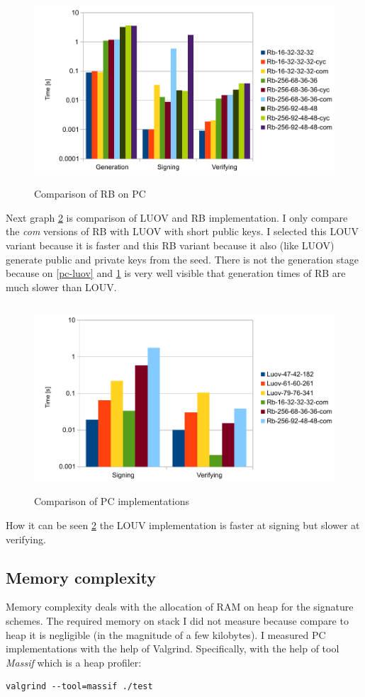 \documentclass[thesis=M,english]{FITthesis}[2019/12/23]
\begin{document}
\begin{figure}[H]
\centering
\includegraphics[width=13cm,height=7cm]{images/pc-rb.pdf}
\caption{Comparison of RB on PC}
\label{pc-rb}
\end{figure}

\noindent
Next graph \ref{pc-all} is comparison of LUOV and RB implementation. I only compare the \textit{com} versions of RB with LUOV with short public keys. I selected this LOUV variant because it is faster and this RB variant because it also (like LUOV) generate public and private keys from the seed.
There is not the generation stage because on \ref{pc-luov} and \ref{pc-rb} is very well visible that generation times of RB are much slower than LOUV. 

\begin{figure}[H]
\centering
\includegraphics[width=13cm,height=7cm]{images/pc-all.pdf}
\caption{Comparison of PC implementations}
\label{pc-all}
\end{figure}

\noindent
How it can be seen \ref{pc-all} the LOUV implementation is faster at signing but slower at verifying.

\subsection{Memory complexity}
Memory complexity deals with the allocation of RAM on heap for the signature schemes. The required memory on stack I did not measure because compare to heap it is negligible (in the magnitude of a few kilobytes). I measured PC implementations with the help of Valgrind. Specifically, with the help of tool \textit{Massif} which is a heap profiler:
\begin{lstlisting}[frame=single]
valgrind --tool=massif ./test
\end{lstlisting}
\end{document}
